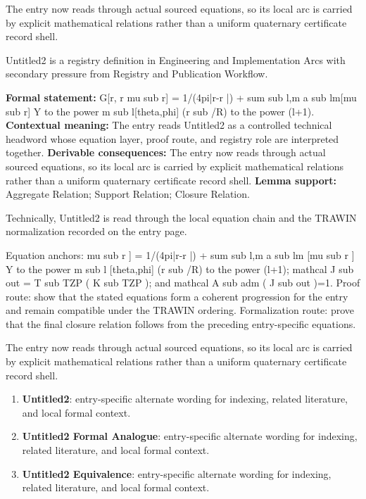 The entry now reads through actual sourced equations, so its local arc is carried by explicit mathematical relations rather than a uniform quaternary certificate record shell.
\clearpage


\begingroup\small
{}
Untitled2 is a registry definition in Engineering and Implementation Arcs with secondary pressure from Registry and Publication Workflow.

\begingroup\footnotesize\setlength{\emergencystretch}{3em}\sloppy
\textbf{Formal statement:} G[r, r mu sub r] = 1/(4pi|r-r |) + sum sub l,m a sub lm[mu sub r] Y to the power m sub l[theta,phi] (r sub /R) to the power (l+1). \textbf{Contextual meaning:} The entry reads Untitled2 as a controlled technical headword whose equation layer, proof route, and registry role are interpreted together. \textbf{Derivable consequences:} The entry now reads through actual sourced equations, so its local arc is carried by explicit mathematical relations rather than a uniform quaternary certificate record shell. \textbf{Lemma support:} Aggregate Relation; Support Relation; Closure Relation.\par
\endgroup

Technically, Untitled2 is read through the local equation chain and the TRAWIN normalization recorded on the entry page.

Equation anchors: mu sub r ] = 1/(4pi|r-r |) + sum sub l,m a sub lm [mu sub r ] Y to the power m sub l [theta,phi] (r sub /R) to the power (l+1); mathcal J sub out = T sub TZP ( K sub TZP ); and mathcal A sub adm ( J sub out )=1. Proof route: show that the stated equations form a coherent progression for the entry and remain compatible under the TRAWIN ordering. Formalization route: prove that the final closure relation follows from the preceding entry-specific equations.

The entry now reads through actual sourced equations, so its local arc is carried by explicit mathematical relations rather than a uniform quaternary certificate record shell.
\endgroup

\begin{enumerate}[leftmargin=1.6em,itemsep=6pt,topsep=4pt]
\item \textbf{Untitled2}: entry-specific alternate wording for indexing, related literature, and local formal context.
\item \textbf{Untitled2 Formal Analogue}: entry-specific alternate wording for indexing, related literature, and local formal context.
\item \textbf{Untitled2 Equivalence}: entry-specific alternate wording for indexing, related literature, and local formal context.
\end{enumerate}

